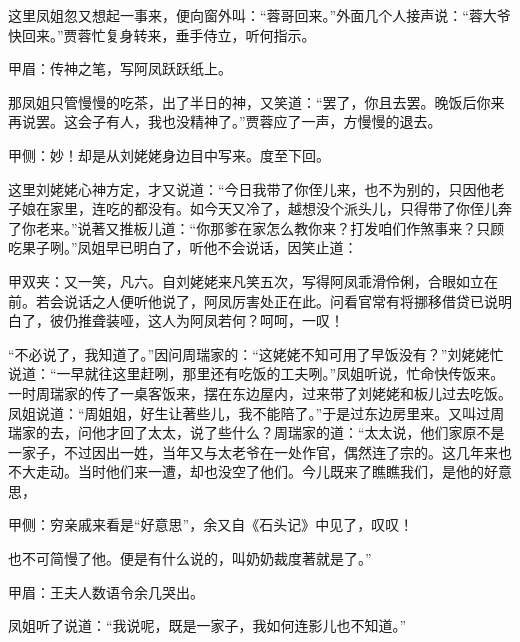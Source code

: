 \begin{parag}
    这里凤姐忽又想起一事来，便向窗外叫：“蓉哥回来。”外面几个人接声说：“蓉大爷快回来。”贾蓉忙复身转来，垂手侍立，听何指示。\begin{note}甲眉：传神之笔，写阿凤跃跃纸上。\end{note}那凤姐只管慢慢的吃茶，出了半日的神，又笑道：“罢了，你且去罢。晚饭后你来再说罢。这会子有人，我也没精神了。”贾蓉应了一声，方慢慢的退去。\begin{note}甲侧：妙！却是从刘姥姥身边目中写来。度至下回。\end{note}
\end{parag}


\begin{parag}
    这里刘姥姥心神方定，才又说道：“今日我带了你侄儿来，也不为别的，只因他老子娘在家里，连吃的都没有。如今天又冷了，越想没个派头儿，只得带了你侄儿奔了你老来。”说著又推板儿道：“你那爹在家怎么教你来？打发咱们作煞事来？只顾吃果子咧。”凤姐早已明白了，听他不会说话，因笑止道：\begin{note}甲双夹：又一笑，凡六。自刘姥姥来凡笑五次，写得阿凤乖滑伶俐，合眼如立在前。若会说话之人便听他说了，阿凤厉害处正在此。问看官常有将挪移借贷已说明白了，彼仍推聋装哑，这人为阿凤若何？呵呵，一叹！\end{note}“不必说了，我知道了。”因问周瑞家的：“这姥姥不知可用了早饭没有？”刘姥姥忙说道：“一早就往这里赶咧，那里还有吃饭的工夫咧。”凤姐听说，忙命快传饭来。一时周瑞家的传了一桌客饭来，摆在东边屋内，过来带了刘姥姥和板儿过去吃饭。凤姐说道：“周姐姐，好生让著些儿，我不能陪了。”于是过东边房里来。又叫过周瑞家的去，问他才回了太太，说了些什么？周瑞家的道：“太太说，他们家原不是一家子，不过因出一姓，当年又与太老爷在一处作官，偶然连了宗的。这几年来也不大走动。当时他们来一遭，却也没空了他们。今儿既来了瞧瞧我们，是他的好意思，\begin{note}甲侧：穷亲戚来看是“好意思”，余又自《石头记》中见了，叹叹！\end{note}也不可简慢了他。便是有什么说的，叫奶奶裁度著就是了。”\begin{note}甲眉：王夫人数语令余几哭出。\end{note}凤姐听了说道：“我说呢，既是一家子，我如何连影儿也不知道。”
\end{parag}


